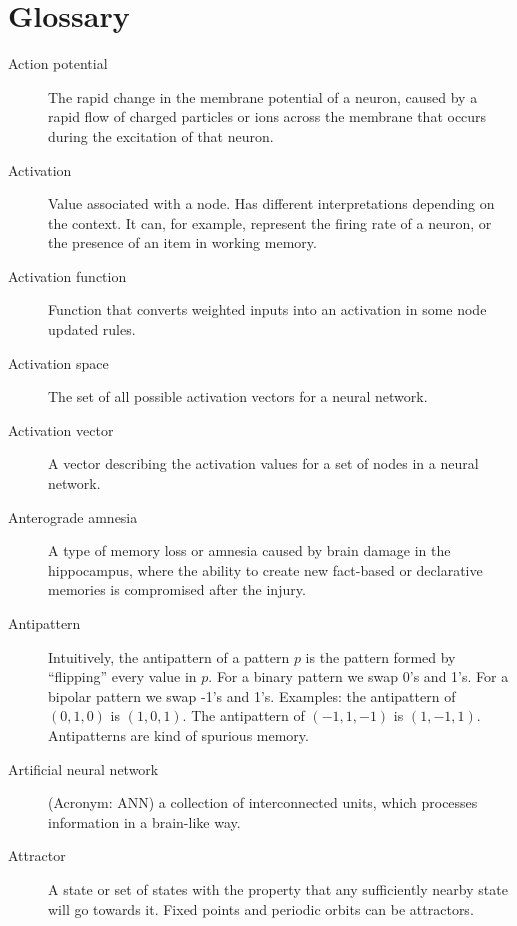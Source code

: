 \chapter{Glossary}

\begin{description}

\item[Action potential] The rapid change in the membrane potential of a neuron, caused by a rapid flow of charged particles or ions across the membrane that occurs during the excitation of that neuron.

\item[Activation] Value associated with a node. Has different interpretations depending on the context. It can, for example, represent the firing rate of a neuron, or the presence of an item in working memory.

\item[Activation function] Function that converts weighted inputs into an activation in some node updated rules.

\item[Activation space] The set of all possible activation vectors for a neural network.

\item[Activation vector] A vector describing the activation values for a set of nodes in a neural network.


\item[Anterograde amnesia] A type of memory loss or amnesia caused by brain damage in the hippocampus, where the ability to create new fact-based or declarative memories is compromised after the injury. 

\item[Antipattern] Intuitively, the antipattern of a pattern $p$ is the pattern formed by ``flipping'' every value in $p$.  For a binary pattern we swap 0's and 1's. For a bipolar pattern we swap -1's and 1's. Examples: the antipattern of $(0,1,0)$ is  $(1,0,1)$. The antipattern of $(-1,1,-1)$ is  $(1,-1,1)$. Antipatterns are  kind of spurious memory.

\item[Artificial neural network] (Acronym: ANN) a collection of interconnected units, which processes information in a brain-like way.

\item[Attractor] A state or set of states with the property that any  sufficiently nearby state will go towards it. Fixed points and periodic orbits can be attractors.


\end{description}
